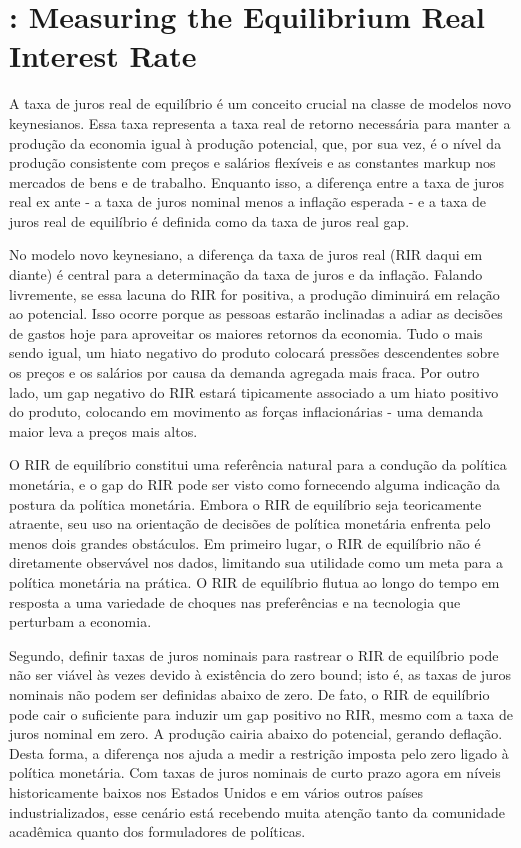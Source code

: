 \section{\citet{Justiniano:2010}: Measuring the Equilibrium Real Interest Rate }

A taxa de juros real de equilíbrio é um conceito crucial na classe de modelos novo keynesianos. Essa taxa representa a taxa real de retorno necessária para manter a produção da economia igual à produção potencial, que, por sua vez, é o nível da produção consistente com preços e salários flexíveis e as constantes markup nos mercados de bens e de trabalho. Enquanto isso, a diferença entre a taxa de juros real ex ante - a taxa de juros nominal menos a inflação esperada - e a taxa de juros real de equilíbrio é definida como da taxa de juros real gap.

No modelo novo keynesiano, a diferença da taxa de juros real (RIR daqui em diante) é central para a determinação da taxa de juros e da inflação. Falando livremente, se essa lacuna do RIR for positiva, a produção diminuirá em relação ao potencial. Isso ocorre porque as pessoas estarão inclinadas a adiar as decisões de gastos hoje para aproveitar os maiores retornos da economia. Tudo o mais sendo igual, um hiato negativo do produto colocará pressões descendentes sobre os preços e os salários por causa da demanda agregada mais fraca. Por outro lado, um gap negativo do RIR estará tipicamente associado a um hiato positivo do produto, colocando em movimento as forças inflacionárias - uma demanda maior leva a preços mais altos.

O RIR de equilíbrio constitui uma referência natural para a condução da política monetária, e o gap do RIR pode ser visto como fornecendo alguma indicação da postura da política monetária. Embora o RIR de equilíbrio seja teoricamente atraente, seu uso na orientação de decisões de política monetária enfrenta pelo menos dois grandes obstáculos. Em primeiro lugar, o RIR de equilíbrio não é diretamente observável nos dados, limitando sua utilidade como um meta para a política monetária na prática. O RIR de equilíbrio flutua ao longo do tempo em resposta a uma variedade de choques nas preferências e na tecnologia que perturbam a economia.

Segundo, definir taxas de juros nominais para rastrear o RIR de equilíbrio pode não ser viável às vezes devido à existência do zero bound; isto é, as taxas de juros nominais não podem ser definidas abaixo de zero. De fato, o RIR de equilíbrio pode cair o suficiente para induzir um gap positivo no RIR, mesmo com a taxa de juros nominal em zero. A produção cairia abaixo do potencial, gerando deflação. Desta forma, a diferença nos ajuda a medir a restrição imposta pelo zero ligado à política monetária. Com taxas de juros nominais de curto prazo agora em níveis historicamente baixos nos Estados Unidos e em vários outros países industrializados, esse cenário está recebendo muita atenção tanto da comunidade acadêmica quanto dos formuladores de políticas.

